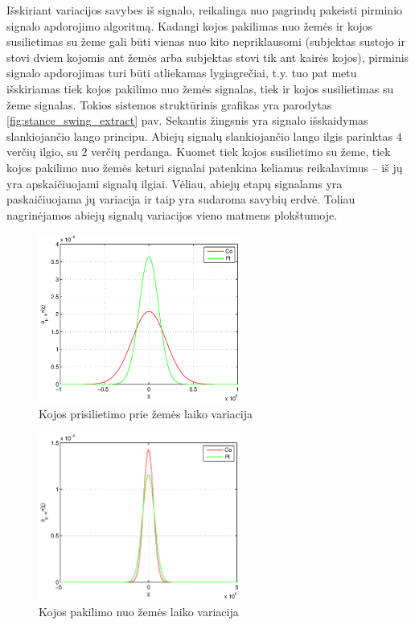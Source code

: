 \documentclass[]{vgtuef}
\begin{document}
Išskiriant variacijos savybes iš signalo, reikalinga nuo pagrindų pakeisti pirminio signalo apdorojimo algoritmą. Kadangi kojos pakilimas nuo žemės ir kojos susilietimas su žeme gali būti vienas nuo kito nepriklausomi (subjektas sustojo ir stovi dviem kojomis ant žemės arba subjektas stovi tik ant kairės kojos), pirminis signalo apdorojimas turi būti atliekamas lygiagrečiai, t.y. tuo pat metu išskiriamas tiek kojos pakilimo nuo žemės signalas, tiek ir kojos susilietimas su žeme signalas. Tokios sistemos struktūrinis grafikas yra parodytas \ref{fig:stance_swing_extract} pav. Sekantis žingsnis yra signalo išskaidymas slankiojančio lango principu. Abiejų signalų slankiojančio lango ilgis parinktas $4$ verčių ilgio, su $2$ verčių perdanga. Kuomet tiek kojos susilietimo su žeme, tiek kojos pakilimo nuo žemės keturi signalai patenkina keliamus reikalavimus -- iš jų yra apskaičiuojami signalų ilgiai. Vėliau, abiejų etapų signalams yra paskaičiuojama jų variacija ir taip yra sudaroma savybių erdvė. Toliau nagrinėjamos abiejų signalų variacijos vieno matmens plokštumoje.

\begin{figure}[!t]
  \centering
  \includegraphics[width=250px]{figures/stance_phase.eps}
  \caption{Kojos prisilietimo prie žemės laiko variacija}
  \label{fig:stance_var}
\end{figure}

\begin{figure}[!t]
  \centering
  \includegraphics[width=250px]{figures/swing_phase.eps}
  \caption{Kojos pakilimo nuo žemės laiko variacija}
  \label{fig:swing_var}
\end{figure}
\end{document}
